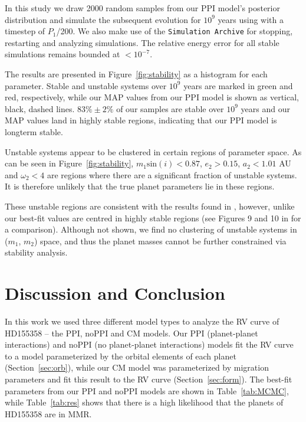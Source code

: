 In this study we draw 2000 random samples from our PPI model's posterior distribution and simulate the subsequent evolution for $10^9$ years using \whfast with a timestep of $P_1$/200. 
We also make use of the {\tt Simulation Archive} \citep{Rein2017} for stopping, restarting and analyzing simulations. 
The relative energy error for all stable simulations remains bounded at $< 10^{-7}$.

The results are presented in Figure~\ref{fig:stability} as a histogram for each parameter.
Stable and unstable systems over $10^9$ years are marked in green and red, respectively, while our MAP values from our PPI model is shown as vertical, black, dashed lines. 
$83\% \pm 2\%$ of our samples are stable over $10^9$ years and our MAP values land in highly stable regions, indicating that our PPI model is longterm stable. 

Unstable systems appear to be clustered in certain regions of parameter space.
As can be seen in Figure~\ref{fig:stability}, $m_1\textrm{sin}(i)<0.87$, $e_2>0.15$, $a_2<1.01$ AU and $\omega_2<4$ are regions where there are a significant fraction of unstable systems.
It is therefore unlikely that the true planet parameters lie in these regions. 

These unstable regions are consistent with the results found in \R, however, unlike \R our best-fit values are centred in highly stable regions (see Figures 9 and 10 in \R for a comparison). 
Although not shown, we find no clustering of unstable systems in ($m_1$, $m_2$) space, and thus the planet masses cannot be further constrained via stability analysis.  

\section{Discussion and Conclusion}
\label{sec:conc}
In this work we used three different model types to analyze the RV curve of HD155358 -- the PPI, noPPI and CM models. 
Our PPI (planet-planet interactions) and noPPI (no planet-planet interactions) models fit the RV curve to a model parameterized by the orbital elements of each planet (Section~\ref{sec:orb}), while our CM model was parameterized by migration parameters and fit this result to the RV curve (Section~\ref{sec:form}).
The best-fit parameters from our PPI and noPPI models are shown in Table~\ref{tab:MCMC}, while Table~\ref{tab:res} shows that there is a high likelihood that the planets of HD155358 are in MMR. 

